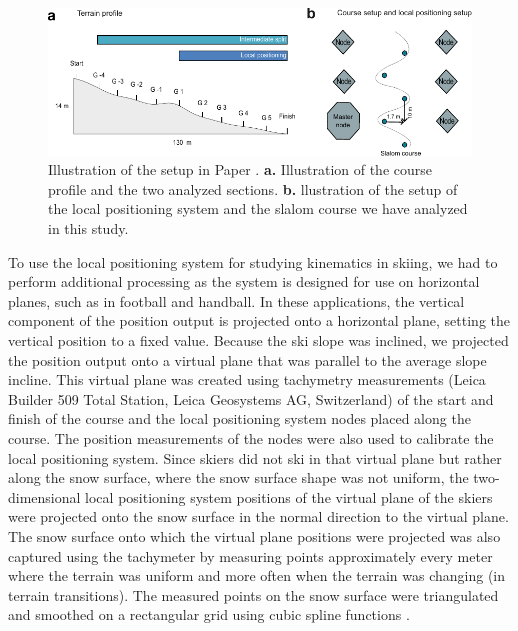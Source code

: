 \begin{figure}
    \centering
    \includegraphics[width=1\linewidth]{figure/figure_methods_LPSoverview.pdf}
    \caption[Illustration of the setup in Paper ]{Illustration of the setup in Paper . \textbf{a.} Illustration of the course profile and the two analyzed sections. \textbf{b.} llustration of the setup of the local positioning system and the slalom course we have analyzed in this study.}
    \label{fig: lps}
\end{figure}

To use the local positioning system for studying kinematics in skiing, we had to perform additional processing as the system is designed for use on horizontal planes, such as in football and handball. In these applications, the vertical component of the position output is projected onto a horizontal plane, setting the vertical position to a fixed value. Because the ski slope was inclined, we projected the position output onto a virtual plane that was parallel to the average slope incline. This virtual plane was created using tachymetry measurements (Leica Builder 509 Total Station, Leica Geosystems AG, Switzerland) of the start and finish of the course and the local positioning system nodes placed along the course. The position measurements of the nodes were also used to calibrate the local positioning system. Since skiers did not ski in that virtual plane but rather along the snow surface, where the snow surface shape was not uniform, the two-dimensional local positioning system positions of the virtual plane of the skiers were projected onto the snow surface in the normal direction to the virtual plane. The snow surface onto which the virtual plane positions were projected was also captured using the tachymeter by measuring points approximately every meter where the terrain was uniform and more often when the terrain was changing (in terrain transitions). The measured points on the snow surface were triangulated and smoothed on a rectangular grid using cubic spline functions  \cite{gilgien_determination_2013}. 

